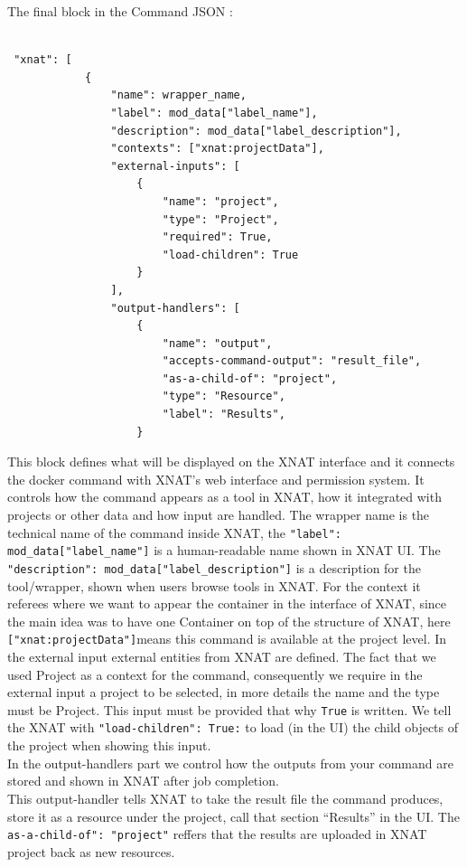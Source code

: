 The final block in the Command JSON :

\begin{lstlisting}

 "xnat": [
            {
                "name": wrapper_name,
                "label": mod_data["label_name"],
                "description": mod_data["label_description"],
                "contexts": ["xnat:projectData"],  
                "external-inputs": [
                    { 
                        "name": "project",
                        "type": "Project",
                        "required": True,
                        "load-children": True
                    }
                ],
                "output-handlers": [
                    {
                        "name": "output",
                        "accepts-command-output": "result_file",
                        "as-a-child-of": "project",
                        "type": "Resource",
                        "label": "Results",
                    }
\end{lstlisting}

This block defines what will be displayed on the XNAT interface and it connects the docker command with XNAT's web interface and permission system. It controls how the command appears as a tool in XNAT, how it integrated with projects or other data and how input are handled.
The wrapper name is the technical name of the command inside XNAT, the \texttt{"label": mod\_data["label\_name"]} is a human-readable name shown in XNAT UI. The \texttt{"description": mod\_data["label\_description"]} is a description for the tool/wrapper, shown when users browse tools in XNAT. For the context it referees where we want to appear the container in the interface of XNAT, since the main idea was to have one Container on top of the structure of XNAT, here \texttt{["xnat:projectData"]}means this command is available at the project level.
 In the external input external entities from XNAT are defined. The fact that we used Project as a context for the command, consequently we require in the external input a project to be selected, in more details the name and the type must be Project. This input must be provided that why \texttt{True} is written.
 We tell the XNAT with \texttt{"load-children": True:} to load (in the UI) the child objects of the project when showing this input.\\
 In the output-handlers part we control  how the outputs from your command are stored and shown in XNAT after job completion.\\
 This output-handler tells XNAT to take the result file the command produces, store it as a resource under the project, call that section “Results” in the UI. 
 The \texttt{as-a-child-of": "project"} reffers that the results are uploaded in XNAT project back as new resources.

